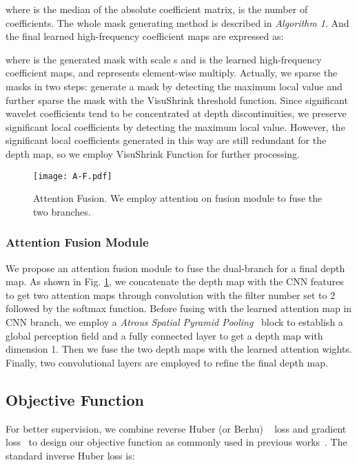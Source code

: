 \documentclass[10pt,times,mathptm,psfig,twocolumn,journals]{IEEEtran}
\begin{document}
where  is the median of the absolute coefficient matrix,  is the number of coefficients. The whole mask generating method is described in \textit{Algorithm 1}. And the final learned high-frequency coefficient maps  are expressed as:

where  is the generated mask with scale s and  is the learned high-frequency coefficient maps, and  represents element-wise multiply. Actually, we sparse the masks in two steps: generate a mask by detecting the maximum local value and further sparse the mask with the VisuShrink threshold function. Since significant wavelet coefficients tend to be concentrated at depth discontinuities, we preserve significant local coefficients by detecting the maximum local value. However, the significant local coefficients generated in this way are still redundant for the depth map, so we employ VisuShrink Function for further processing.
\begin{figure}[t]
\centering
\texttt{[image: A-F.pdf]}
\caption{Attention Fusion. We employ attention on fusion module to fuse the two branches.}
\label{fig:AF}
\end{figure}
\subsubsection{Attention Fusion Module}
\label{AF}
We propose an attention fusion module to fuse the dual-branch for a final depth map. As shown in Fig. \ref{fig:AF}, we concatenate the depth map with the CNN features to get two attention maps through convolution with the filter number set to 2 followed by the softmax function. Before fusing with the learned attention map in CNN branch, we employ a \textit{Atrous Spatial Pyramid Pooling}~\cite{chen2014semantic} block to establish a global perception field and a fully connected layer to get a depth map with dimension 1. Then we fuse the two depth maps with the learned attention wights. Finally, two convolutional layers are employed to refine the final depth map.  \subsection{Objective Function}
\label{objective}
For better supervision, we combine reverse Huber (or Berhu) ~\cite{laina2016deeper,2020BiFuse,Pintore_2021_CVPR, Jiang_2021} loss and gradient loss~\cite{shen2021distortion} to design our objective function as commonly used in previous works~\cite{shen2021distortion,Pintore_2021_CVPR}. The standard inverse Huber loss is:
\end{document}
